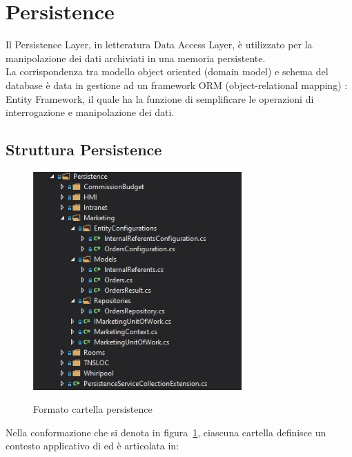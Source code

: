 \section{Persistence}
\label{chap:persistence}
Il Persistence Layer, in letteratura Data Access Layer, è utilizzato per la manipolazione dei dati archiviati in una memoria persistente.\\
La corrispondenza tra modello object oriented (domain model) e schema del database è data in gestione ad un framework ORM (object-relational mapping) \cite{EF}: Entity Framework, il quale ha la funzione di semplificare le operazioni di interrogazione e manipolazione dei dati.

\subsection{Struttura Persistence}
\begin{figure}[h!]
\begin{center}
  \includegraphics[width=8cm]{images/Persistence.jpg}\\
  \caption{Formato cartella persistence}\label{fig:persistence}
\end{center}
\end{figure}

Nella conformazione che si denota in figura~\ref{fig:persistence}, ciascuna cartella definisce un contesto applicativo di ed è articolata in:


